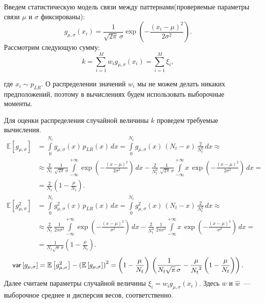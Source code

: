 \documentclass[12pt,fсeqn]{article}
\begin{document}
Введем статистическую модель связи между паттернами(проверяемые параметры связи $\mu$ и $\sigma$ фиксированы):
$$
g_{\mu,\sigma}(x_i)=\frac{1}{\sqrt{2\pi}\,\sigma}\exp\left(- \frac{(x_i-\mu)^2}{2\sigma^2} \right).
$$
Рассмотрим следующую сумму:
\begin{equation}\label{k_stat}
k=\sum_{i=1}^M w_ig_{\mu,\sigma}(x_i)= \sum_{i=1}^M \xi_i, 
\end{equation}


где $x_i\sim p_{LR}$. О распределении значений $w_i$ мы не можем
делать никаких предположений, поэтому в вычислениях будем использовать выборочные моменты.

Для оценки распределения случайной величины $k$ проведем требуемые вычисления.
$$
\begin{aligned}
\mathbb{E} \left[ g_{\mu,\sigma} \right] &= \int\limits_{0}^{N_t}g_{\mu,\sigma}(x)\,p_{LR}(x)\,dx=
\int\limits_{0}^{N_t}g_{\mu,\sigma}(x)\,(N_t-x)\,\frac{2}{N_t^2}\,dx \approx \\
&\approx \frac2{N_t} \, \frac1{\sqrt{2\pi}\,\sigma}  \int\limits_{-\infty}^{+\infty}\exp\left( -\frac{(x-\mu)^2}{2\sigma^2} \right) \, dx 
- \frac2{N_t^2} \, \frac1{\sqrt{2\pi}\,\sigma} \int\limits_{-\infty}^{+\infty}x\,\exp\left( -\frac{(x-\mu)^2}{2\sigma^2} \right) \, dx = \\
&=\frac2{N_t} \left(1-\frac{\mu}{N_t}\right).
\end{aligned}
$$
$$
\begin{aligned}
\mathbb{E} \left[ g^2_{\mu,\sigma} \right] &= \int\limits_{0}^{N_t}g^2_{\mu,\sigma}(x)\,p_{LR}(x)\,dx=
\int\limits_{0}^{N_t}g^2_{\mu,\sigma}(x)\,(N_t-x)\,\frac{2}{N_t^2}\,dx \approx \\
&\approx \frac2{N_t} \, \frac1{2\pi\sigma^2}  \int\limits_{-\infty}^{+\infty}\exp\left( -\frac{(x-\mu)^2}{\sigma^2} \right) \, dx 
- \frac2{N_t^2} \, \frac1{2\pi\sigma^2} \int\limits_{-\infty}^{+\infty}x\,\exp\left( -\frac{(x-\mu)^2}{\sigma^2} \right) \, dx = \\
&=\frac1{N_t\sqrt{\pi}\,\sigma} \left(1-\frac{\mu}{N_t}\right).
\end{aligned}
$$
$$
\mathsf{var} \left[ g_{\mu,\sigma} \right] = \mathbb{E} \left[ g^2_{\mu,\sigma} \right]  - \left( \mathbb{E} \left[ g_{\mu,\sigma} \right] \right)^ 2 = 
\left( 1-\frac{\mu}{N_t} \right)\,\left( \frac1{{N_t}\sqrt{\pi}\,\sigma} - \frac{\mu}{{N_t}^2} \left( 1- \frac{\mu}{N_t} \right) \right).
$$
Далее считаем параметры случайной величины $\xi_i=w_ig_{\mu,\sigma}(x_i)$. Здесь $\overline{w}$ и $\hat{w}$~--- выборочное среднее и дисперсия весов, соответственно.
\end{document}
